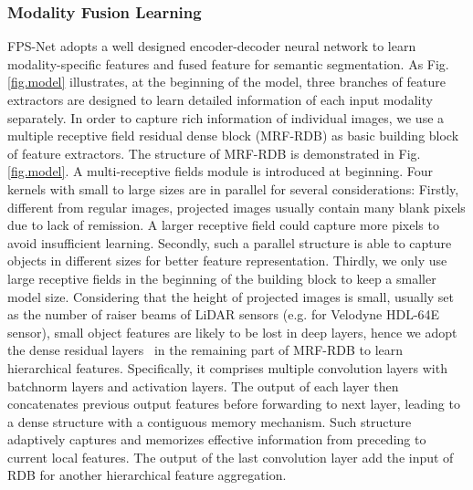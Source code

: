 \documentclass[preprint,review,3p]{elsarticle}
\begin{document}
\subsubsection{Modality Fusion Learning}\label{Sec.domain_fusion_learn}
FPS-Net adopts a well designed encoder-decoder neural network to learn modality-specific features  and fused feature for semantic segmentation. 
As Fig. \ref{fig.model} illustrates, at the beginning of the model, three branches of feature extractors are designed to learn detailed information of each input modality separately. In order to capture rich information of individual images, we use a multiple receptive field residual dense block (MRF-RDB) as basic building block of feature extractors. The structure of MRF-RDB is demonstrated in Fig. \ref{fig.model}. A multi-receptive fields module is introduced at beginning. Four kernels with small to large sizes are in parallel for several considerations: Firstly, different from regular images, projected images usually contain many blank pixels due to lack of remission. A larger receptive field could capture more pixels to avoid insufficient learning. Secondly, such a parallel structure is able to capture objects in different sizes for better feature representation. Thirdly, we only use large receptive fields in the beginning of the building block to keep a smaller model size. Considering that the height of projected images is small, usually set as the number of raiser beams of LiDAR sensors (e.g.  for Velodyne HDL-64E sensor), small object features are likely to be lost in deep layers, hence we adopt the dense residual layers~\cite{zhang2018residual} in the remaining part of MRF-RDB to learn hierarchical features. Specifically, it comprises multiple convolution layers with batchnorm layers and activation layers. The output of each layer then concatenates previous output features before forwarding to next layer, leading to a dense structure with a contiguous memory mechanism. Such structure adaptively captures and memorizes effective information from preceding to current local features. The output of the last convolution layer add the input of RDB for another hierarchical feature aggregation. 
\end{document}
